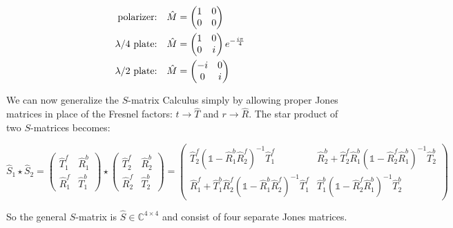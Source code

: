 \begin{equation}
\begin{split}
   \qq*{polarizer:} \hat{M} &=
   \begin{pmatrix}
       1 & 0\\
       0 & 0
   \end{pmatrix}\\
   \qq*{$\lambda / 4$ plate:} \hat{M} &=
   \begin{pmatrix}
       1 & 0\\
       0 & i
   \end{pmatrix}
   e^{-\frac{i \pi}{4}}\\
   \qq*{$\lambda / 2$ plate:} \hat{M} &=
   \begin{pmatrix}
       -i & 0\\
       0 & i
   \end{pmatrix}\\
\end{split}
\end{equation}

We can now generalize the $S$-matrix Calculus simply by allowing proper Jones matrices in place of the Fresnel factors: $t \rightarrow \hat T$ and $r \rightarrow \hat R$. The star product of two $S$-matrices becomes:

\begin{equation}\label{eq:bg:star}
    \hat S_1 \star \hat S_2 =
    \begin{pmatrix}
        \hat T^f_1 & \hat R^b_1 \\
        \hat R^f_1 & \hat T^b_1
    \end{pmatrix}
    \star
    \begin{pmatrix}
        \hat T^f_2 & \hat R^b_2 \\
        \hat R^f_2 & \hat T^b_2
    \end{pmatrix}
    =
    \begin{pmatrix}
        \hat T^f_2 (\mathbb 1 - \hat R^b_1 \hat R^f_2)^{-1} \hat T^f_1 &
        \hat R^b_2 + \hat T^f_2 \hat R^b_1 (\mathbb 1 - \hat R^f_2 \hat R^b_1)^{-1} \hat T^b_2\\
        \hat R^f_1 + \hat T^b_1 \hat R^f_2 (\mathbb 1 - \hat R^b_1 \hat R^f_2)^{-1} \hat T^f_1 &
        \hat T^b_1 (\mathbb 1 - \hat R^f_2 \hat R^b_1)^{-1} \hat T^b_2
    \end{pmatrix}
\end{equation}

So the general $S$-matrix is $\hat S \in \mathbb C^{4 \times 4}$ and consist of four separate Jones matrices.
